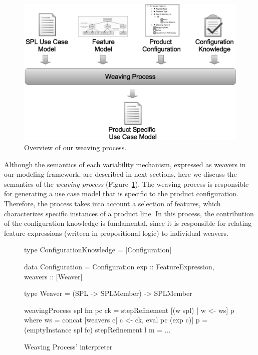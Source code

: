 \begin{figure}[h]
 \begin{center}
  \includegraphics[scale=0.30]{img/weave-process2.eps}
  \caption{Overview of our weaving process.}
  \label{fig:weave-process}
  \end{center}
\end{figure}

Although the semantics of each variability mechanism, expressed as weavers in
our modeling framework, are described in next sections, here we discuss the
semantics of the \emph{weaving process} (Figure~\ref{fig:weave-process}). The
weaving process is responsible for generating a use case model that is specific to the
product configuration. Therefore, the process takes into account a selection of
features, which characterizes specific instances of a product line. In this
process, the contribution of the configuration knowledge is fundamental, since
it is responsible for relating feature expressions (writeen in propositional
logic) to individual weavers.

\begin{figure}[ht]
\begin{code}
type ConfigurationKnowledge = [Configuration]

data Configuration  = Configuration {
 exp :: FeatureExpression,
 weavers :: [Weaver] 	
}

type Weaver = (SPL -> SPLMember) -> SPLMember

weavingProcess spl fm pc ck =
   stepRefinement [(w spl) | w <- ws] p
   where
    ws = concat [weavers c| c <- ck, eval pc (exp c)]
    p = (emptyInstance spl fc)
    stepRefinement l m = ...   	
\end{code}
\caption{Weaving Process' interpreter}
\label{fig:wp-semantics}
\end{figure}

